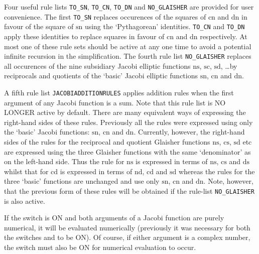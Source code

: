 \hypertarget{reserved:TO_SN}{}
\hypertarget{reserved:TO_CN}{}
\hypertarget{reserved:TO_DN}{}
\hypertarget{reserved:NO_GLAISHER}{}
\hypertarget{reserved:JacobiAdditionRules}{}
Four useful rule lists \texttt{TO\_SN}, \texttt{TO\_CN}, \texttt{TO\_DN} and
\texttt{NO\_GLAISHER} are provided for user convenience. The first
\texttt{TO\_SN} replaces occurences of the squares of $\mathrm{cn}$ and
$\mathrm{dn}$ in favour of the square of $\mathrm{sn}$ using the
`Pythagorean' identities. \texttt{TO\_CN} and \texttt{TO\_DN} apply these
identities to replace squares in favour of $\mathrm{cn}$ and $\mathrm{dn}$
respectively. At most one of these rule sets should be active at any one time
to avoid a potential infinite recursion in the simplification.
The fourth rule list \texttt{NO\_GLAISHER} replaces all occurences of the
nine subsidiary Jacobi elliptic functions $\mathrm{ns}$, $\mathrm{sc}$,
$\mathrm{sd}$, \ldots by reciprocals and quotients of the `basic' Jacobi
elliptic functions $\mathrm{sn}$, $\mathrm{cn}$ and $\mathrm{dn}$.

A fifth rule list \texttt{JACOBIADDITIONRULES} applies addition rules when the
first argument of any Jacobi function is a sum.  Note that this rule list is NO
LONGER active by default. There are many equivalent ways of expressing the
right-hand sides of these rules. Previously all the rules were expressed using
only the `basic' Jacobi functions: $\mathrm{sn}$, $\mathrm{cn}$ and
$\mathrm{dn}$. Currently, however, the right-hand sides of the rules for the
reciprocal and quotient Glaisher functions $\mathrm{ns}$, $\mathrm{cs}$,
$\mathrm{sd}$ etc are expressed using the three Glaisher functions with
the same `denominator' as on the left-hand side. Thus the rule for $\mathrm{ns}$
is expressed in terms of $\mathrm{ns}$, $\mathrm{cs}$ and $\mathrm{ds}$
whilst that for $\mathrm{cd}$ is expressed in terms of $\mathrm{nd}$,
$\mathrm{cd}$ and $\mathrm{sd}$ whereas the rules for the three `basic'
functions are unchanged and use only $\mathrm{sn}$, $\mathrm{cn}$ and
$\mathrm{dn}$.  Note, however, that the previous form of these rules will be
obtained if the rule-list \texttt{NO\_GLAISHER} is also active. 

If the switch  is ON and both arguments of a Jacobi function are
purely numerical, it will be evaluated numerically (previously it was
necessary for both the switches  and  to be ON).
Of course, if either argument is a complex number, the switch  must
also be ON for numerical evaluation to occur.

